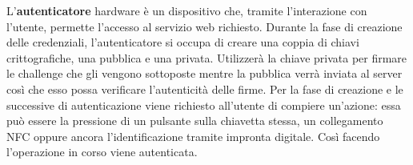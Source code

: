 
L'\textbf{autenticatore} hardware è un dispositivo che, tramite l'interazione con l'utente, permette l'accesso al servizio web richiesto. Durante la fase di creazione delle credenziali, l'autenticatore si occupa di creare una coppia di chiavi crittografiche, una pubblica e una privata. Utilizzerà la chiave privata per firmare le challenge che gli vengono sottoposte mentre la pubblica verrà inviata al server così che esso possa verificare l'autenticità delle firme.
Per la fase di creazione e le successive di autenticazione viene richiesto all'utente di compiere un'azione: essa può essere la pressione di un pulsante sulla chiavetta stessa, un collegamento NFC oppure ancora l'identificazione tramite impronta digitale. Così facendo l'operazione in corso viene autenticata.




